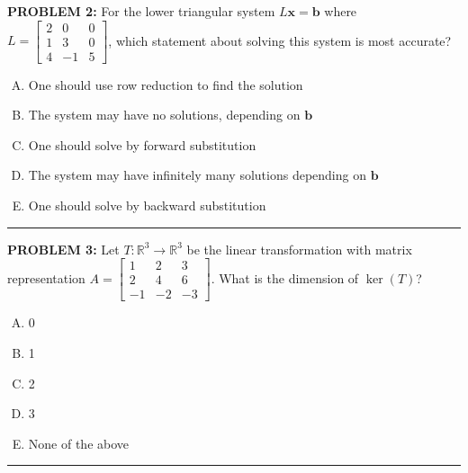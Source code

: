 \documentclass[12pt]{amsart}
\newcommand{\divider}{
  \vspace{-1em} %
  \noindent
  \raisebox{-0.15ex}{\textbullet}%
  \hspace{0.5em}%
  \rule[0.5ex]{0.95\textwidth}{1.0pt}%
  \hspace{0.5em}%
  \raisebox{-0.15ex}{\textbullet}%
  \vspace{0em} %
}
\begin{document}
{\bf PROBLEM 2:}
For the lower triangular system $L\mathbf{x} = \mathbf{b}$ where $L = \begin{bmatrix} 2 & 0 & 0 \\ 1 & 3 & 0 \\ 4 & -1 & 5 \end{bmatrix}$, which statement about solving this system is most accurate?

\begin{enumerate}[(A)]
\item One should use row reduction to find the solution
\item The system may have no solutions, depending on $\mathbf{b}$
\item One should solve by forward substitution
\item The system may have infinitely many solutions depending on $\mathbf{b}$
\item One should solve by backward substitution
\end{enumerate}
\divider



{\bf PROBLEM 3:}
Let $T: \mathbb{R}^3 \to \mathbb{R}^3$ be the linear transformation with matrix representation $A = \begin{bmatrix} 1 & 2 & 3 \\ 2 & 4 & 6 \\ -1 & -2 & -3 \end{bmatrix}$. What is the dimension of $\ker(T)$?
\begin{enumerate}[(A)]
\item 0 %
\item 1 %
\item 2 %
\item 3 %
\item None of the above
\end{enumerate}
\divider
\end{document}
